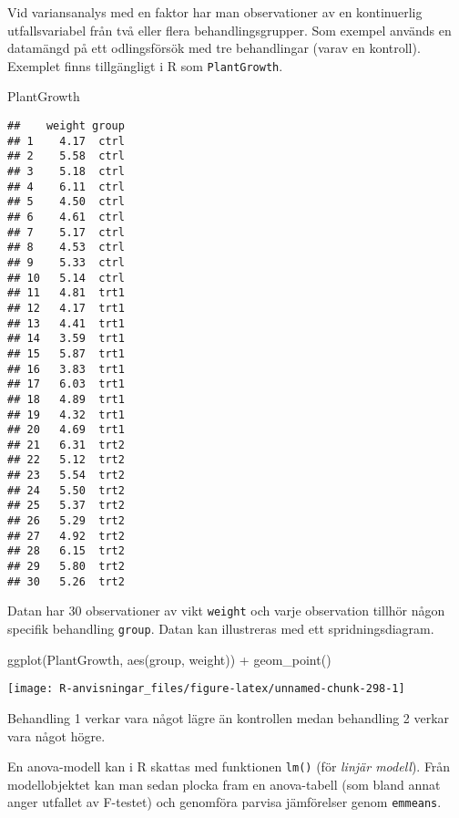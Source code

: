 \documentclass[
]{book}
\newenvironment{Shaded}{\begin{snugshade}}{\end{snugshade}}
\newcommand{\FunctionTok}[1]{\textcolor[rgb]{0.00,0.00,0.00}{#1}}
\newcommand{\NormalTok}[1]{#1}
\newcommand{\SpecialCharTok}[1]{\textcolor[rgb]{0.00,0.00,0.00}{#1}}
\theoremstyle{definition}
\theoremstyle{definition}
\theoremstyle{definition}
\theoremstyle{definition}
\theoremstyle{remark}
\begin{document}
Vid variansanalys med en faktor har man observationer av en kontinuerlig utfallsvariabel från två eller flera behandlingsgrupper. Som exempel används en datamängd på ett odlingsförsök med tre behandlingar (varav en kontroll). Exemplet finns tillgängligt i R som \texttt{PlantGrowth}.

\begin{Shaded}
\begin{Highlighting}[]
\NormalTok{PlantGrowth}
\end{Highlighting}
\end{Shaded}

\begin{verbatim}
##    weight group
## 1    4.17  ctrl
## 2    5.58  ctrl
## 3    5.18  ctrl
## 4    6.11  ctrl
## 5    4.50  ctrl
## 6    4.61  ctrl
## 7    5.17  ctrl
## 8    4.53  ctrl
## 9    5.33  ctrl
## 10   5.14  ctrl
## 11   4.81  trt1
## 12   4.17  trt1
## 13   4.41  trt1
## 14   3.59  trt1
## 15   5.87  trt1
## 16   3.83  trt1
## 17   6.03  trt1
## 18   4.89  trt1
## 19   4.32  trt1
## 20   4.69  trt1
## 21   6.31  trt2
## 22   5.12  trt2
## 23   5.54  trt2
## 24   5.50  trt2
## 25   5.37  trt2
## 26   5.29  trt2
## 27   4.92  trt2
## 28   6.15  trt2
## 29   5.80  trt2
## 30   5.26  trt2
\end{verbatim}

Datan har 30 observationer av vikt \texttt{weight} och varje observation tillhör någon specifik behandling \texttt{group}. Datan kan illustreras med ett spridningsdiagram.

\begin{Shaded}
\begin{Highlighting}[]
\FunctionTok{ggplot}\NormalTok{(PlantGrowth, }\FunctionTok{aes}\NormalTok{(group, weight)) }\SpecialCharTok{+}
  \FunctionTok{geom\_point}\NormalTok{()}
\end{Highlighting}
\end{Shaded}

\begin{center}\texttt{[image: R-anvisningar\_files/figure-latex/unnamed-chunk-298-1]} \end{center}

Behandling 1 verkar vara något lägre än kontrollen medan behandling 2 verkar vara något högre.

En anova-modell kan i R skattas med funktionen \texttt{lm()} (för \emph{linjär modell}). Från modellobjektet kan man sedan plocka fram en anova-tabell (som bland annat anger utfallet av F-testet) och genomföra parvisa jämförelser genom \texttt{emmeans}.
\end{document}
